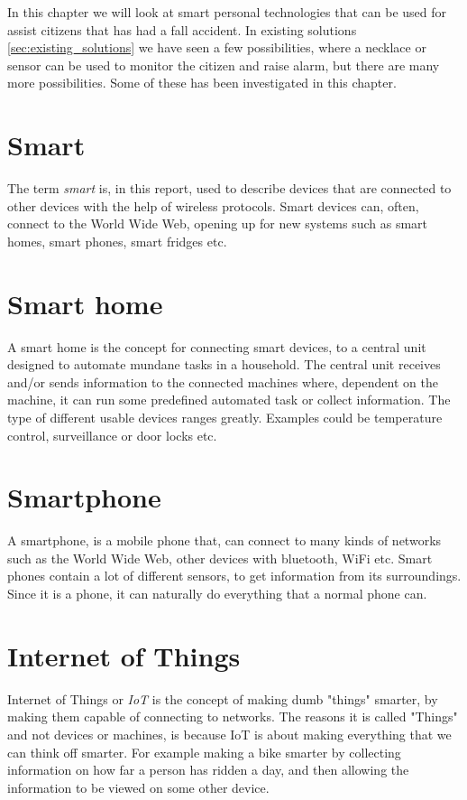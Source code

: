 \label{chap:technologies}
In this chapter we will look at smart personal technologies that can be used for assist citizens that has had a fall accident. In existing solutions \ref{sec:existing_solutions} we have seen a few possibilities, where a necklace or sensor can be used to monitor the citizen and raise alarm, but there are many more possibilities. Some of these has been investigated in this chapter.


\section{Smart}
The term \textit{smart} is, in this report, used to describe devices that are connected to other devices with the help of wireless protocols. Smart devices can, often, connect to the World Wide Web, opening up for new systems such as smart homes, smart phones, smart fridges etc. 

\section{Smart home}
A smart home is the concept for connecting smart devices, to a central unit designed to automate mundane tasks in a household. The central unit receives and/or sends information to the connected machines where, dependent on the machine, it can run some predefined automated task or collect information. The type of different usable devices ranges greatly. Examples could be temperature control, surveillance or door locks etc.


\section{Smartphone}
A smartphone, is a mobile phone that, can connect to many kinds of networks such as the World Wide Web, other devices with bluetooth, WiFi etc. Smart phones contain a lot of different sensors, to get information from its surroundings. Since it is a phone, it can naturally do everything that a normal phone can. 


\section{Internet of Things}
Internet of Things or \textit{IoT} is the concept of making dumb "things" smarter, by making them capable of connecting to networks. The reasons it is called "Things" and not devices or machines, is because IoT is about making everything that we can think off smarter. For example making a bike smarter by collecting information on how far a person has ridden a day, and then allowing the information to be viewed on some other device.

